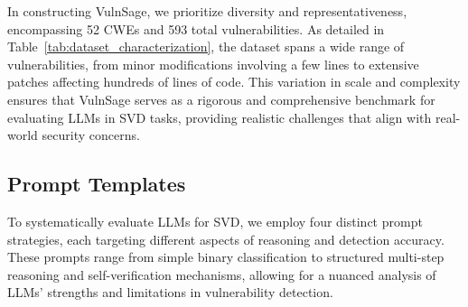 \documentclass[sigconf]{acmart}
\begin{document}
In constructing VulnSage, we prioritize diversity and representativeness, encompassing 52 CWEs and 593 total vulnerabilities. As detailed in Table~\ref{tab:dataset_characterization}, the dataset spans a wide range of vulnerabilities, from minor modifications involving a few lines to extensive patches affecting hundreds of lines of code. This variation in scale and complexity ensures that VulnSage serves as a rigorous and comprehensive benchmark for evaluating LLMs in SVD tasks, providing realistic challenges that align with real-world security concerns.
\begin{table}[htbp]
    \centering
    \caption{Dataset Characterization}
    \renewcommand{\arraystretch}{0.8}
    \label{tab:dataset_characterization}
\end{table}
\subsection{Prompt Templates}
\label{subsection:prompts}
To systematically evaluate LLMs for SVD, we employ four distinct prompt strategies, each targeting different aspects of reasoning and detection accuracy. These prompts range from simple binary classification to structured multi-step reasoning and self-verification mechanisms, allowing for a nuanced analysis of LLMs’ strengths and limitations in vulnerability detection.
\end{document}
